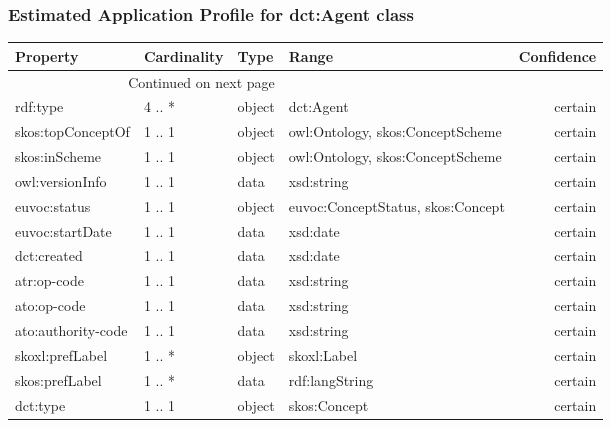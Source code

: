 \documentclass[10pt,a4paper,titlepage,final]{article}
\begin{document}
\subsubsection{Estimated Application Profile for dct:Agent class}
\begin{tabularx}{\textwidth}{lllXr}
\toprule
               Property & Cardinality &    Type &                                              Range & Confidence \\
\midrule
\endhead
\midrule
\multicolumn{3}{r}{{Continued on next page}} \\
\midrule
\endfoot

\bottomrule
\endlastfoot
               rdf:type &      4 .. * &  object &                                          dct:Agent &    certain \\
      skos:topConceptOf &      1 .. 1 &  object &                   owl:Ontology, skos:ConceptScheme &    certain \\
          skos:inScheme &      1 .. 1 &  object &                   owl:Ontology, skos:ConceptScheme &    certain \\
        owl:versionInfo &      1 .. 1 &    data &                                         xsd:string &    certain \\
           euvoc:status &      1 .. 1 &  object &                  euvoc:ConceptStatus, skos:Concept &    certain \\
        euvoc:startDate &      1 .. 1 &    data &                                           xsd:date &    certain \\
            dct:created &      1 .. 1 &    data &                                           xsd:date &    certain \\
            atr:op-code &      1 .. 1 &    data &                                         xsd:string &    certain \\
            ato:op-code &      1 .. 1 &    data &                                         xsd:string &    certain \\
     ato:authority-code &      1 .. 1 &    data &                                         xsd:string &    certain \\
        skoxl:prefLabel &      1 .. * &  object &                                        skoxl:Label &    certain \\
         skos:prefLabel &      1 .. * &    data &                                     rdf:langString &    certain \\
               dct:type &      1 .. 1 &  object &                                       skos:Concept &    certain \\

\end{tabularx}
\end{document}
